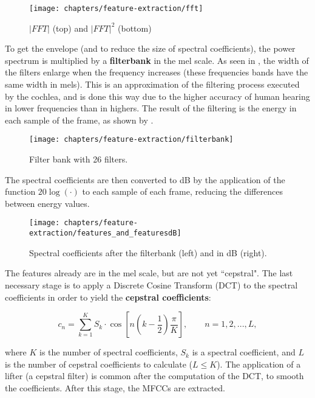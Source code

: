 \begin{figure}[ht]
    \centering
    \texttt{[image: chapters/feature-extraction/fft]}
    \caption{$|FFT|$ (top) and $|FFT|^2$ (bottom)}
    \label{fig:fft}
\end{figure}


To get the envelope (and to reduce the size of spectral coefficients), the power spectrum is multiplied by a \textbf{filterbank} in the mel scale. As seen in , the width of the filters enlarge when the frequency increases (these frequencies bands have the same width in mels). This is an approximation of the filtering process executed by the cochlea, and is done this way due to the higher accuracy of human hearing in lower frequencies than in highers. The result of the filtering is the energy in each sample of the frame, as shown by .

\begin{figure}[ht]
    \centering
    \texttt{[image: chapters/feature-extraction/filterbank]}
    \caption{Filter bank with 26 filters.}
    \label{fig:filterbank}
\end{figure}


The spectral coefficients are then converted to dB by the application of the function $20\log(\cdot)$ to each sample of each frame, reducing the differences between energy values.

\begin{figure}[ht]
    \centering
    \texttt{[image: chapters/feature-extraction/features\_and\_featuresdB]}
    \caption{Spectral coefficients after the filterbank (left) and in dB (right).}
    \label{fig:features_and_featuresdB}
\end{figure}


The features already are in the mel scale, but are not yet ``cepstral". The last necessary stage is to apply a Discrete Cosine Transform (DCT) to the spectral coefficients in order to yield the \textbf{cepstral coefficients}:

\begin{equation}
    c_n = \sum_{k=1}^K S_k\cdot\cos\left[n\left(k - \frac{1}{2}\right)\frac{\pi}{K}\right],\qquad n = 1, 2, ..., L,
    \label{eq:dct}
\end{equation}

\noindent where $K$ is the number of spectral coefficients, $S_k$ is a spectral coefficient, and $L$ is the number of cepstral coefficients to calculate ($L \leq K$). The application of a lifter (a cepstral filter) is common after the computation of the DCT, to smooth the coefficients. After this stage, the MFCCs are extracted.

